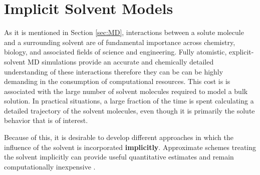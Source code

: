 \section{Implicit Solvent Models}\label{sec:implicit}
\vspace{3cm}
\par
As it is mentioned in Section \ref{sec:MD}, interactions between a solute molecule and a surrounding solvent are of fundamental importance across chemistry, biology, and associated fields of science and engineering. Fully atomistic, explicit-solvent MD simulations provide an accurate and chemically detailed understanding of these interactions therefore they can be can be highly demanding in the consumption of computational resources. This cost is is associated with the large number of solvent molecules required to model a bulk solution. In practical situations, a large fraction of the time is spent calculating a detailed trajectory of the solvent molecules, even though it is primarily the solute behavior that is of interest.

Because of this, it is desirable to develop different approaches in which the influence of the solvent is incorporated \textbf{implicitly}. Approximate schemes treating the solvent implicitly can provide useful quantitative estimates and remain computationally inexpensive \cite{roux1999implicit} \cite{zacharias2003continuum}.


